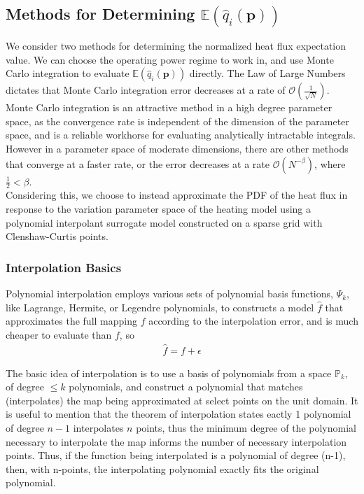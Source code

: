 \documentclass{article}
\begin{document}
\subsection{Methods for Determining $\mathbb{E}(\hat{q}_i(\textbf{p}))$}

We consider two methods for determining the normalized heat flux expectation value. We can choose the operating power regime to work in, and use Monte Carlo integration to evaluate $\mathbb{E}(\hat{q}_i(\textbf{p}))$ directly. The Law of Large Numbers dictates that Monte Carlo integration error decreases at a rate of $\mathcal{O}(\frac{1}{\sqrt{N}})$. Monte Carlo integration is an attractive method in a high degree parameter space, as the convergence rate is independent of the dimension of the parameter space, and is a reliable workhorse for evaluating analytically intractable integrals. However in a parameter space of moderate dimensions, there are other methods that converge at a faster rate, or the error decreases at a rate $\mathcal{O}(N^{-\beta})$, where $\frac{1}{2} <\beta$.\\


Considering this, we choose to instead approximate the PDF of the heat flux in response to the variation parameter space of the heating model using a polynomial interpolant surrogate model constructed on a sparse grid with Clenshaw-Curtis points. \\
\subsubsection{Interpolation Basics}
Polynomial interpolation employs various sets of polynomial basis functions, $\Psi_k$, like Lagrange, Hermite, or Legendre polynomials, to constructs a model $\hat{f}$ that  approximates the full mapping $f$ according to the interpolation error, and is much cheaper to evaluate than $f$, \cite{R_Smith} so 
\begin{align*}
\hat{f} = f + \epsilon
\end{align*}


The basic idea of interpolation is to use a basis of polynomials from a  space $\mathbb{P}_k$, of degree $\le k$ polynomials, and construct a polynomial that matches (interpolates) the map being approximated at select points on the unit domain. It is useful to mention that the theorem of interpolation states eactly 1 polynomial of degree $n-1$ interpolates $n$ points, thus the minimum degree of the polynomial necessary to interpolate the map informs the number of necessary interpolation points. Thus, if the function being interpolated is a polynomial of degree (n-1), then, with n-points, the interpolating polynomial exactly fits the original polynomial.\\
\end{document}
